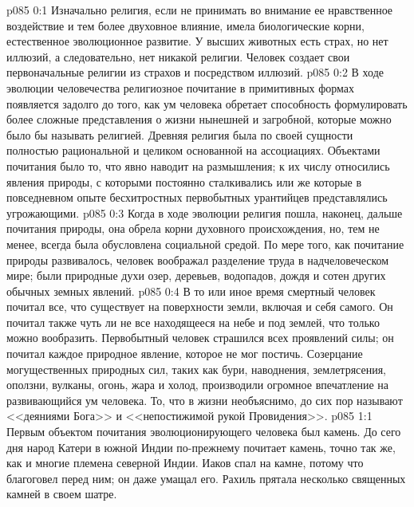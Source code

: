\vs p085 0:1 Изначально религия, если не принимать во внимание ее нравственное воздействие и тем более двуховное влияние, имела биологические корни, естественное эволюционное развитие. У высших животных есть страх, но нет иллюзий, а следовательно, нет никакой религии. Человек создает свои первоначальные религии из страхов и посредством иллюзий.
\vs p085 0:2 В ходе эволюции человечества религиозное почитание в примитивных формах появляется задолго до того, как ум человека обретает способность формулировать более сложные представления о жизни нынешней и загробной, которые можно было бы называть религией. Древняя религия была по своей сущности полностью рациональной и целиком основанной на ассоциациях. Объектами почитания было то, что явно наводит на размышления; к их числу относились явления природы, с которыми постоянно сталкивались или же которые в повседневном опыте бесхитростных первобытных урантийцев представлялись угрожающими.
\vs p085 0:3 Когда в ходе эволюции религия пошла, наконец, дальше почитания природы, она обрела корни духовного происхождения, но, тем не менее, всегда была обусловлена социальной средой. По мере того, как почитание природы развивалось, человек воображал разделение труда в надчеловеческом мире; были природные духи озер, деревьев, водопадов, дождя и сотен других обычных земных явлений.
\vs p085 0:4 В то или иное время смертный человек почитал все, что существует на поверхности земли, включая и себя самого. Он почитал также чуть ли не все находящееся на небе и под землей, что только можно вообразить. Первобытный человек страшился всех проявлений силы; он почитал каждое природное явление, которое не мог постичь. Созерцание могущественных природных сил, таких как бури, наводнения, землетрясения, оползни, вулканы, огонь, жара и холод, производили огромное впечатление на развивающийся ум человека. То, что в жизни необъяснимо, до сих пор называют <<деяниями Бога>> и <<непостижимой рукой Провидения>>.
\vs p085 1:1 Первым объектом почитания эволюционирующего человека был камень. До сего дня народ Катери в южной Индии по\hyp{}прежнему почитает камень, точно так же, как и многие племена северной Индии. Иаков спал на камне, потому что благоговел перед ним; он даже умащал его. Рахиль прятала несколько священных камней в своем шатре.
